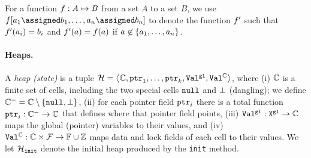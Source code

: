 For a function $f:A\mapsto B$ from a set $A$ to
a set $B$, we use 
$\fun[\aelem_1\assigned\belem_1,\ldots,\aelem_\nn\assigned\belem_\nn]$ 
to denote the function
$f'$ such that $f'(a_i)=b_i$ and 
$f'(a)=f(a)$ if 
$a\not\in\left\{a_1,\ldots,a_n\right\}$.
%

%


\paragraph{Heaps.}
A {\it heap (state)} is a tuple ${\mathcal H}=\left\langle{\mathbb C},\mathtt{ptr}_1, \ldots , \mathtt{ptr}_k,{\tt Val}^{\tt gl},{\tt Val}^{{\mathbb C}}\right\rangle$, where
(i)
${\mathbb C}$ is a finite set of cells, including the two special cells
${\tt null}$ and $\bot$ (dangling);
%
we define ${\mathbb C}^{-}={\mathbb C}\setminus\left\{{\tt null},\bot\right\}$,
%
(ii)
for each pointer field $\mathtt{ptr}_i$ there is a total function
$\mathtt{ptr}_i:{\mathbb C}^{-}\to{\mathbb C}$
that defines where that pointer field points,
(iii)
${\tt Val}^{\tt gl}:{\tt X}^{\tt gl}\to{\mathbb C}$ maps the global (pointer)
variables to their values, and
(iv)
${\tt Val}^{{\mathbb C}}:{\mathbb C}\times\mathcal{F}\to\mathbb{F}\cup{\mathbb Z}$
maps data and lock fields of each cell to their values.
%
We let ${\mathcal H}_{\tt init}$ denote the initial heap produced by the
{\tt init} method.

